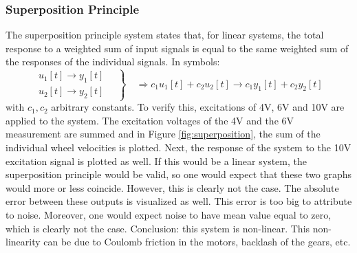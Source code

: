 \documentclass[a4paper,kul]{kulakarticle} %
\begin{document}
\subsubsection{Superposition Principle}
The superposition principle system states that, for linear systems, the total response to a weighted sum of input signals is equal to the same weighted sum of the responses of the individual signals. In symbols:
\begin{equation}
\left.
\begin{split}
	u_1[t] \rightarrow y_1[t]\\
	u_2[t] \rightarrow y_2[t]
\end{split}
\quad
\right\}
\quad \Longrightarrow c_1 u_1[t] + c_2 u_2[t] \rightarrow c_1 y_1[t] + c_2 y_2[t]
\end{equation}
with $c_1, c_2$ arbitrary constants. To verify this, excitations of 4V, 6V and 10V are applied to the system. The excitation voltages of the 4V and the 6V measurement are summed and in Figure \ref{fig:superposition}, the sum of the individual wheel velocities is plotted. Next, the response of the system to the 10V excitation signal is plotted as well. If this would be a linear system, the superposition principle would be valid, so one would expect that these two graphs would more or less coincide. However, this is clearly not the case. The absolute error between these outputs is visualized as well. This error is too big to attribute to noise. Moreover, one would expect noise to have mean value equal to zero, which is clearly not the case. Conclusion: this system is non-linear. This non-linearity can be due to Coulomb friction in the motors, backlash of the gears, etc.
\end{document}
